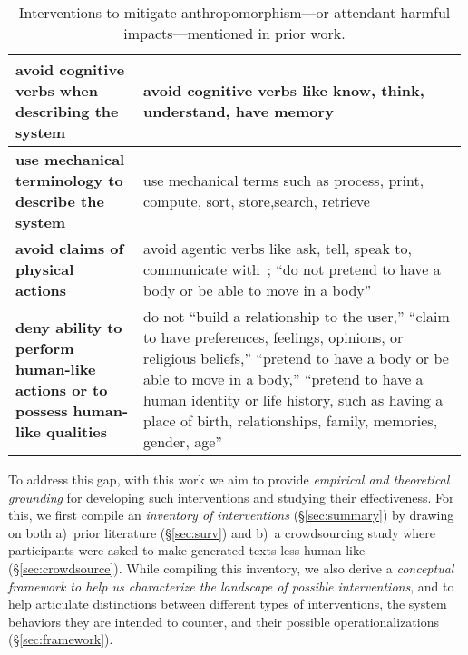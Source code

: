 \documentclass[11pt]{article}
\newcounter{intervention}  %
\begin{document}
\begin{table*}[th]
\begin{tabular}{
@{}p{0.28\linewidth}
|p{0.71\linewidth}@{}
}
\textbf{avoid cognitive verbs when describing the system}       
& avoid cognitive verbs like know, think, understand, have memory \cite{Inie2024-dy,shneidermandumpty}                          
\\\hline

\textbf{use mechanical terminology to describe the system} 
& use mechanical terms such as process,  print,  compute,  sort,  store,search,  retrieve \cite{Inie2024-dy}                                                
\\\hline

\textbf{avoid claims of physical actions}                   
& avoid agentic verbs like ask, tell, speak to, communicate with~\cite{Inie2024-dy}; ``do not pretend to have a body or be able to move in a body''~\cite{Glaese2022-qo}                         
\\\hline

\textbf{deny ability to perform human-like actions or to possess human-like qualities}                
& do not ``build a relationship to the user,''  ``claim to have preferences, feelings, opinions, or religious beliefs,''  ``pretend to have a body or be able to move in a body,''  ``pretend to have a human identity or life history, such as having a place of birth, relationships, family, memories, gender, age'' \cite{Glaese2022-qo} 
\\\hline                            

\end{tabular}
\vspace{-6pt}
\caption{Interventions to mitigate anthropomorphism---or attendant harmful impacts---mentioned in prior work.}\label{tab:initial-interventions}
\vspace{-6pt}
\end{table*}

To address this gap, with this work we aim to provide {\em empirical and theoretical grounding} for developing such interventions and studying their effectiveness. 
For this, we first compile an {\em inventory of interventions} (\S\ref{sec:summary}) by drawing on both a)~prior literature (\S\ref{sec:surv}) and b)~a crowdsourcing study where participants were asked to make generated texts less human-like (\S\ref{sec:crowdsource}). 
%
While compiling this inventory, we also derive a {\em conceptual framework to help us characterize the landscape of possible interventions}, and to help articulate distinctions between different types of interventions, the system behaviors they are intended to counter, and their possible operationalizations (\S\ref{sec:framework}). 
\end{document}
